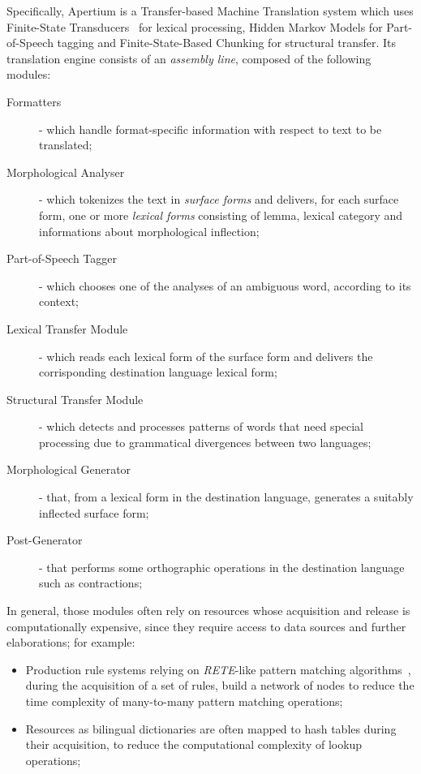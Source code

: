 \documentclass[11pt]{article}
\begin{document}
Specifically, Apertium is a Transfer-based Machine Translation system which uses Finite-State Transducers~\citep{fst} for lexical processing, Hidden Markov Models for Part-of-Speech tagging and Finite-State-Based Chunking for structural transfer. Its translation engine consists of an \emph{assembly line}, composed of the following modules:

\begin{description}
 \item[Formatters] - which handle format-specific information with respect to text to be translated;
 \item[Morphological Analyser] - which tokenizes the text in \emph{surface forms} and delivers, for each surface form, one or more \emph{lexical forms} consisting of lemma, lexical category and informations about morphological inflection;
 \item[Part-of-Speech Tagger] - which chooses one of the analyses of an ambiguous word, according to its context;
 \item[Lexical Transfer Module] - which reads each lexical form of the surface form and delivers the corrisponding destination language lexical form;
 \item[Structural Transfer Module] - which detects and processes patterns of words that need special processing due to grammatical divergences between two languages;
 \item[Morphological Generator] - that, from a lexical form in the destination language, generates a suitably inflected surface form;
 \item[Post-Generator] - that performs some orthographic operations in the destination language such as contractions;
\end{description}

In general, those modules often rely on resources whose acquisition and release is computationally expensive, since they require access to data sources and further elaborations; for example:

\begin{itemize}
 \item Production rule systems relying on \emph{RETE}-like pattern matching algorithms~\citep{forgy}, during the acquisition of a set of rules, build a network of nodes to reduce the time complexity of many-to-many pattern matching operations;
 \item Resources as bilingual dictionaries are often mapped to hash tables during their acquisition, to reduce the computational complexity of lookup operations; 
\end{itemize}
\end{document}

